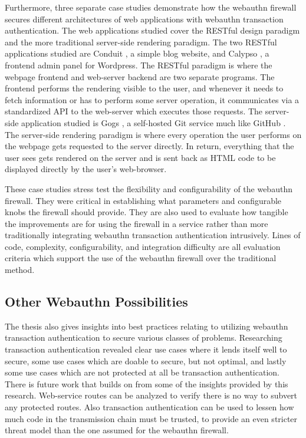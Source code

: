 Furthermore, three separate case studies demonstrate how the webauthn firewall secures different architectures of web applications with webauthn transaction authentication. The web applications studied cover the RESTful design paradigm and the more traditional server-side rendering paradigm. The two RESTful applications studied are Conduit \cite{TODO-conduit}, a simple blog website, and Calypso \cite{TODO-calypso}, a frontend admin panel for Wordpress. The RESTful paradigm is where the webpage frontend and web-server backend are two separate programs. The frontend performs the rendering visible to the user, and whenever it needs to fetch information or has to perform some server operation, it communicates via a standardized API to the web-server which executes those requests. The server-side application studied is Gogs \cite{TODO-gogs}, a self-hosted Git service much like GitHub \cite{TODO-github?}. The server-side rendering paradigm is where every operation the user performs on the webpage gets requested to the server directly. In return, everything that the user sees gets rendered on the server and is sent back as HTML code to be displayed directly by the user's web-browser.

These case studies stress test the flexibility and configurability of the webauthn firewall. They were critical in establishing what parameters and configurable knobs the firewall should provide. They are also used to evaluate how tangible the improvements are for using the firewall in a service rather than more traditionally integrating webauthn transaction authentication intrusively. Lines of code, complexity, configurability, and integration difficulty are all evaluation criteria which support the use of the webauthn firewall over the traditional method.

\subsection{Other Webauthn Possibilities}

The thesis also gives insights into best practices relating to utilizing webauthn transaction authentication to secure various classes of problems. Researching transaction authentication revealed clear use cases where it lends itself well to secure, some use cases which are doable to secure, but not optimal, and lastly some use cases which are not protected at all be transaction authentication. There is future work that builds on from some of the insights provided by this research. Web-service routes can be analyzed to verify there is no way to subvert any protected routes. Also transaction authentication can be used to lessen how much code in the transmission chain must be trusted, to provide an even stricter threat model than the one assumed for the webauthn firewall. 

